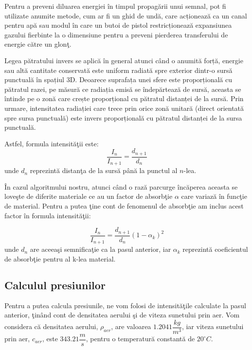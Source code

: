 	Pentru a preveni diluarea energiei în timpul propagării unui semnal, pot fi utilizate anumite metode, cum ar fi un ghid de undă, care acționează ca un canal pentru apă sau modul în care un butoi de pistol restricționează expansiunea gazului fierbinte la o dimensiune pentru a preveni pierderea transferului de energie către un glon\c{t}.
	\bigskip
	
	Legea pătratului invers se aplică în general atunci când o anumită forță, energie sau altă cantitate conservată este uniform radiată spre exterior dintr-o sursă punctuală în spațiul 3D. Deoarece suprafața unei sfere este proporțională cu pătratul razei, pe măsură ce radiația emisă se îndepărtează de sursă, aceasta se întinde pe o zonă care crește proporțional cu pătratul distanței de la surs\u{a}. Prin urmare, intensitatea radiației care trece prin orice zonă unitară (direct orientată spre sursa punctuală) este invers proporțională cu pătratul distanței de la sursa punctuală.
	\bigskip
	
	Astfel, formula intensit\u{a}\c{t}ii este:
	\begin{equation}
		\frac{I_n}{I_{n+1}} = \frac{d_{n+1}}{d_n}
	\end{equation}
	unde $d_n$ reprezint\u{a} distan\c{t}a de la surs\u{a} p\^{a}n\u{a} la punctul al $n$-lea.
	\bigskip
	
	\^{I}n cazul algoritmului nostru, atunci c\^{a}nd o raz\u{a} parcurge \^{i}nc\u{a}perea aceasta se love\c{s}te de diferite materiale ce au un factor de absorb\c{t}ie $\alpha$ care variaz\u{a} \^{i}n func\c{t}ie de material. Pentru a putea \c{t}ine cont de fenomenul de absorb\c{t}ie am inclus acest factor \^{i}n formula intensit\u{a}\c{t}ii:
	
	\begin{equation}
		\frac{I_n}{I_{n+1}} = \frac{d_{n+1}}{d_n}(1-\alpha_k)^2
	\end{equation}
	unde $d_n$ are aceea\c{s}i semnifica\c{t}ie ca la pasul anterior, iar $\alpha_k$ reprezint\u{a} coeficientul de absorb\c{t}ie pentru al k-lea material.

\subsection{Calculul presiunilor}

	Pentru a putea calcula presiunile, ne vom folosi de intensit\u{a}\c{t}ile calculate la pasul anterior, \c{t}in\^{a}nd cont de densitatea aerului \c{s}i de viteza sunetului prin aer. Vom considera c\u{a} densitatea aerului, $\rho_{aer}$, are valoarea $1.2041\dfrac{kg}{m^3}$, iar viteza sunetului prin aer, $c_{aer}$, este $343.21\dfrac{m}{s}$, pentru o temperatur\u{a} constant\u{a} de $20^{\circ}C$.
	\bigskip
	
